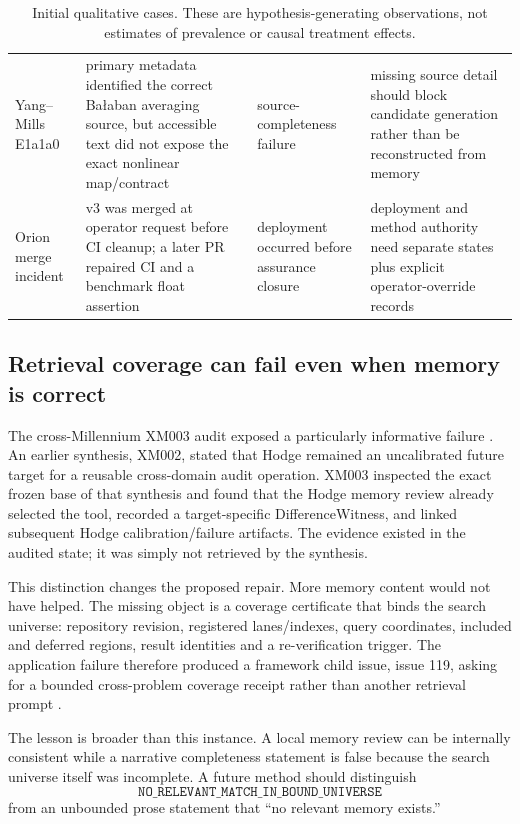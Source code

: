 \begin{table}[ht]
\begin{tabularx}{\textwidth}{p{}p{}Y Y}
Yang--Mills E1a1a0 & primary metadata identified the correct Ba\l aban averaging source, but accessible text did not expose the exact nonlinear map/contract & source-completeness failure & missing source detail should block candidate generation rather than be reconstructed from memory \\
Orion merge incident & v3 was merged at operator request before CI cleanup; a later PR repaired CI and a benchmark float assertion & deployment occurred before assurance closure & deployment and method authority need separate states plus explicit operator-override records \\
\bottomrule
\end{tabularx}
\caption{Initial qualitative cases. These are hypothesis-generating observations, not estimates of prevalence or causal treatment effects.}
\label{tab:pilot-cases}
\end{table}

\subsection{Retrieval coverage can fail even when memory is correct}

The cross-Millennium XM003 audit exposed a particularly informative failure \cite{raklmath_xm003}. An earlier synthesis, XM002, stated that Hodge remained an uncalibrated future target for a reusable cross-domain audit operation. XM003 inspected the exact frozen base of that synthesis and found that the Hodge memory review already selected the tool, recorded a target-specific DifferenceWitness, and linked subsequent Hodge calibration/failure artifacts. The evidence existed in the audited state; it was simply not retrieved by the synthesis.

This distinction changes the proposed repair. More memory content would not have helped. The missing object is a coverage certificate that binds the search universe: repository revision, registered lanes/indexes, query coordinates, included and deferred regions, result identities and a re-verification trigger. The application failure therefore produced a framework child issue, \RAKL{} issue 119, asking for a bounded cross-problem coverage receipt rather than another retrieval prompt \cite{rakl_issue119}.

The lesson is broader than this instance. A local memory review can be internally consistent while a narrative completeness statement is false because the search universe itself was incomplete. A future \RAKL{} method should distinguish
\[
\texttt{NO\_RELEVANT\_MATCH\_IN\_BOUND\_UNIVERSE}
\]
from an unbounded prose statement that ``no relevant memory exists.''

